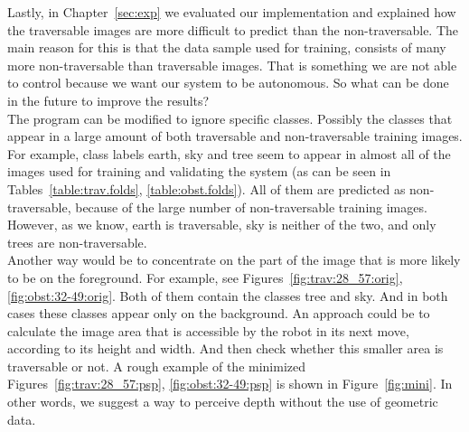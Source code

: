 \documentclass[12pt,a4paper,table,dvipsnames,tikz]{report}
\newcommand{\bl}[1]{{\hypersetup{linkcolor=blue}#1}}
\begin{document}
	Lastly, in Chapter~\ref{sec:exp} we evaluated our implementation and explained how 
	the traversable images are more difficult to predict than the non-traversable. The 
	main reason for this is that the data sample used for training, consists of many 
	more non-traversable than traversable images. That is something we are not able 
	to control because we want our system to be autonomous. So what can be done in the 
	future to improve the results?
	\\
	
	The program can be modified to ignore specific classes. Possibly the classes that 
	appear in a large amount of both traversable and non-traversable training images. 
	For example, class labels earth, sky and tree seem to appear in almost all of the 
	images used for training and validating the system (as can be seen in 
	Tables~\bl{\ref{table:trav.folds}, \ref{table:obst.folds}}). All of them are 
	predicted as non-traversable, because of the large number of non-traversable 
	training images. However, as we know, earth is traversable, sky is neither of the 
	two, and only trees are non-traversable. 
	\\
	
	Another way would be to concentrate on the part of the image that is more likely 
	to be on the foreground. For example, see Figures~\bl{\ref{fig:trav:28_57:orig}, 
	\ref{fig:obst:32-49:orig}}. Both of them contain the classes tree and sky. And in 
	both cases these classes appear only on the background. An approach could be to 
	calculate the image area that is accessible by the robot in its next move, according 
	to its height and width. And then check whether this smaller area is traversable 
	or not. A rough example of the minimized Figures~\bl{\ref{fig:trav:28_57:psp}, 
	\ref{fig:obst:32-49:psp}} is shown in Figure~\bl{\ref{fig:mini}}. In other words, 
	we suggest a way to perceive depth without the use of geometric data.
	\\
	
\end{document}
